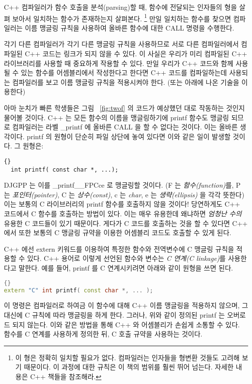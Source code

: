 C++ 컴파일러가 함수 호출을 분석(parsing)할 때, 함수에 전달되는 인자들의 형을 살펴 보아서 일치하는 함수가 존재하는지
살펴본다. \footnote{이 형은 정확히 일치할 필요가 없다. 컴파일러는 인자들을 형변환 것들도 고려해 보기 때문이다. 이 
과정에 대한 규칙은 이 책의 범위를 훨씬 뛰어 넘는다. 자세한 내용은 C++ 책들을 참조해라.} 만일 일치하는 함수를 찾으면 
컴파일러는 이름 맹글링 규칙을 사용하여 올바른 함수에 대한 {\code CALL} 명령을 수행한다. 

각기 다른 컴파일러가 각기 다른 맹글링 규칙을 사용하므로 서로 다른 컴파일러에서 컴파일된 C++ 코드는 링크가
되지 않을 수 있다. 이 사실은 우리가 미리 컴파일된 C++ 라이브러리를 사용할 때 중요하게 작용할 수 있다. 만일
우리가 C++ 코드와 함께 사용될 수 있는 함수를 어셈블리에서 작성한다고 한다면 C++ 코드를 컴파일하는데 사용되는
컴파일러를 보고 이름 맹글링 규칙을 적용시켜야 한다. (또는 아래에 나온 기술을 이용한다) 

아마 눈치가 빠른 학생들은 그림 ~\ref{fig:twof} 의 코드가 예상했던 대로 작동하는 것인지 물어볼 것이다. C++ 는
모든 함수의 이름을 맹글링하기에 {\code printf} 함수도 맹글링 되므로 컴파일러는 라벨 {\code \_printf} 에 올바른
{\code CALL} 을 할 수 없다는 것이다. 이는 올바른 생각이다. {\code printf} 의 원형이 단순히 파일 상단에 놓여 있다면
이와 같은 일이 발생할 것이다. 그 원형은:

\begin{lstlisting}[stepnumber=0]{}
  int printf( const char *, ...);
\end{lstlisting}
\noindent DJGPP 는 이를 {\code \_printf\_\_FPCce} 로 맹글링할 것이다.
({\code F} 는 \emph{함수(function)}를, {\code P} 는 \emph{포인터(pointer)},
{\code C} 는 \emph{상수(const)}, {\code c} 는 \emph{char}, {\code e} 는 \emph{생략(ellipsis)}
을 각각 뜻한다) 이는 보통의 C 라이브러리의 {\code printf} 함수를 호출하지 않을 것이다!
당연하게도 C++ 코드에서 C 함수를 호출하는 방법이 있다. 이는 매우 유용한데 왜냐하면 
\emph{엄청난 수의} 유용한 C 코드들이 있기 때문이다. 게다가 C 코드를 호출하는 것을 할 수 있다면
C++ 에서 또한 보통의 C 맹글링 규약을 이용한 어셈블리 코드도 호출할 수 있게 된다. 

C++ 에선 {\code extern} 키워드를 이용하여 특정한 함수와 전역변수에 C 맹글링 규칙을 적용할 수 있다. 
C++ 용어로 이렇게 선언된 함수와 변수는 \emph{C 연계(C linkage)}를 사용한다고 말한다. 예를 들어, 
{\code printf} 를 C 연계시키려면 아래와 같이 원형을 쓰면 된다.

\begin{lstlisting}[language=C++,stepnumber=0]{}
extern "C" int printf( const char *, ... );
\end{lstlisting}
\noindent 이 명령은 컴파일러로 하여금 이 함수에 대해 C++ 이름 맹글링을 
적용하지 않으며, 그 대신에 C 규칙에 따라 맹글링을 하게 한다. 그러나, 
위와 같이 정의된 {\code printf} 는 오버로드 되지 않는다. 이와 같은 방법을 통해 
C++ 와 어셈블리가 손쉽게 소통할 수 있다. 함수를 C 연계를 사용하게 정의한 뒤, C 호출
규약을 사용하는 것이다.

